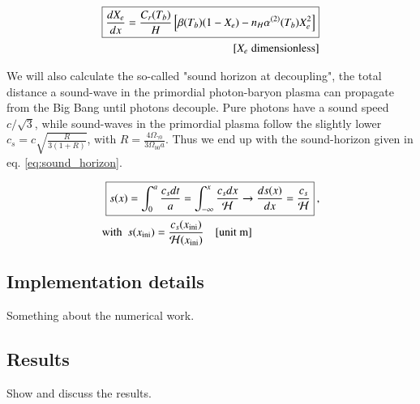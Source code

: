 \begin{equation}\label{eq:peebles_equation}
\begin{aligned}
\boxed{\frac{dX_e}{dx} = \frac{C_r(T_b)}{H} \left[\beta(T_b)(1-X_e) - n_H \alpha^{(2)}(T_b)X_e^2\right]} \\
{[X_e \; \rm dimensionless]}
\end{aligned}
\end{equation}

We will also calculate the so-called "sound horizon at decoupling", the total distance a sound-wave in the primordial photon-baryon plasma can propagate from the Big Bang until photons decouple. Pure photons have a sound speed $c/\sqrt{3}$, while sound-waves in the primordial plasma follow the slightly lower $c_s = c \sqrt{\frac{R}{3(1+R)}}$, with $R = \frac{4\Omega_{\gamma 0}}{3\Omega_{b 0} a}$. Thus we end up with the sound-horizon given in eq. \ref{eq:sound_horizon}.

\begin{equation}\label{eq:sound_horizon}
\begin{aligned}
\Aboxed{s(x) &= \int_0^{a} \frac{c_s dt}{a} = \int_{-\infty}^{x} \frac{c_s dx}{\mathcal{H}} \to \frac{ds(x)}{dx} = \frac{c_s}{\mathcal{H}}}\:,\\
\text{with}\,\,\,&s(x_{\rm ini}) = \frac{c_s(x_{\rm ini})}{\mathcal{H}(x_{\rm ini})} \quad {\text{[unit \unit{m}]}}
\end{aligned}
\end{equation}


\subsection{Implementation details}
Something about the numerical work.

\subsection{Results}
Show and discuss the results.
